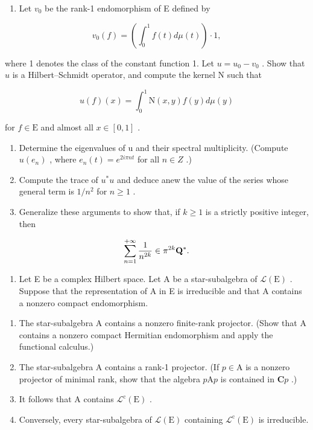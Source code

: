 \begin{enumerate}
\def\labelenumi{\alph{enumi})}
\setcounter{enumi}{2}
\tightlist
\item
  Let \(v_{0}\) be the rank-1 endomorphism of E defined by
\end{enumerate}

\[
v _ {0} (f) = \left(\int_ {0} ^ {1} f (t) d \mu (t)\right) \cdot 1,
\]

where 1 denotes the class of the constant function 1. Let \(u = u_0 - v_0\) . Show that \(u\) is a Hilbert--Schmidt operator, and compute the kernel N such that

\[
u (f) (x) = \int_ {0} ^ {1} \mathrm{N} (x, y) f (y) d \mu (y)
\]

for \(f \in \mathrm{E}\) and almost all \(x \in [0,1]\) .

\begin{enumerate}
\def\labelenumi{\alph{enumi})}
\setcounter{enumi}{3}
\item
  Determine the eigenvalues of u and their spectral multiplicity. (Compute \(u(e_{n})\) , where \(e_{n}(t) = e^{2i\pi nt}\) for all \(n \in Z\) .)
\item
  Compute the trace of \(u^{*}u\) and deduce anew the value of the series whose general term is \(1/n^{2}\) for \(n \geqslant 1\) .
\item
  Generalize these arguments to show that, if \(k \geqslant 1\) is a strictly positive integer, then
\end{enumerate}

\[
\sum_ {n = 1} ^ {+ \infty} \frac {1}{n ^ {2 k}} \in \pi^ {2 k} {\bf Q} ^ {*}.
\]

\begin{enumerate}
\def\labelenumi{\arabic{enumi})}
\setcounter{enumi}{9}
\tightlist
\item
  Let E be a complex Hilbert space. Let A be a star-subalgebra of \(\mathcal{L}(\mathrm{E})\) . Suppose that the representation of A in E is irreducible and that A contains a nonzero compact endomorphism.
\end{enumerate}

\begin{enumerate}
\def\labelenumi{\alph{enumi})}
\item
  The star-subalgebra A contains a nonzero finite-rank projector. (Show that A contains a nonzero compact Hermitian endomorphism and apply the functional calculus.)
\item
  The star-subalgebra A contains a rank-1 projector. (If \(p \in \mathrm{A}\) is a nonzero projector of minimal rank, show that the algebra \(p\mathrm{A}p\) is contained in \(\mathbf{C}p\) .)
\item
  It follows that A contains \(\mathcal{L}^{\mathrm{c}}(\mathrm{E})\) .
\item
  Conversely, every star-subalgebra of \(\mathcal{L}(\mathrm{E})\) containing \(\mathcal{L}^{\mathrm{c}}(\mathrm{E})\) is irreducible.
\end{enumerate}

